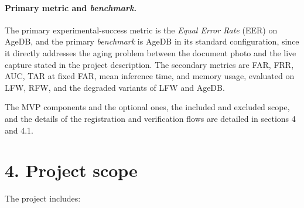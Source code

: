 \documentclass[
  11pt, %
]{charter}
\begin{document}
\paragraph{Primary metric and \textit{benchmark}.}
The primary experimental-success metric is the \textit{Equal Error Rate} (EER) on AgeDB, and the primary \textit{benchmark} is AgeDB in its standard configuration, since it directly addresses the aging problem between the document photo and the live capture stated in the project description. The secondary metrics are FAR, FRR, AUC, TAR at fixed FAR, mean inference time, and memory usage, evaluated on LFW, RFW, and the degraded variants of LFW and AgeDB.

The MVP components and the optional ones, the included and excluded scope, and the details of the registration and verification flows are detailed in sections 4 and 4.1.

\section{4. Project scope}
\label{sec:alcance}

The project includes:
\end{document}
